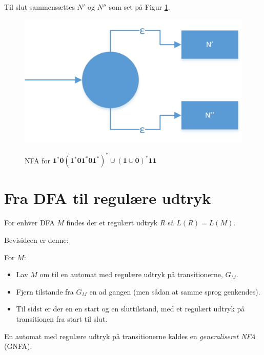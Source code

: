 \documentclass[a4paper,10pt,article]{memoir}
\begin{document}
\begin{eksempel}
Til slut sammensættes $N'$ og $N''$ som set på Figur \ref{fig:fig15}.

\begin{figure}[H]%
{\centering 
\includegraphics[width=\textwidth]{Fig15x.png}
} \caption{NFA for $\mathbf{1^*0(1^*01^*01^*)^*  \cup (1 \cup 0)^*11}$}
\label{fig:fig15}
\end{figure}
\end{eksempel}

\chapter{Fra DFA til regulære udtryk}

\begin{saetning}\label{saet:gnfa}
For enhver DFA $M$ findes der et regulært udtryk $R$ så $L(R)=L(M)$.
\end{saetning}

Bevisideen er denne:

For $M$:
\begin{itemize}
\item Lav $M$ om til en automat med regulære udtryk på transitionerne, $G_M$.
\item Fjern tilstande fra $G_M$ en ad gangen (men sådan at samme sprog genkendes).
\item Til sidst er der en en start og en sluttilstand, med et regulært udtryk på transitionen fra start til slut.
\end{itemize}

En automat med regulære udtryk på transitionerne kaldes en
\emph{generaliseret NFA} (GNFA).
\end{document}
